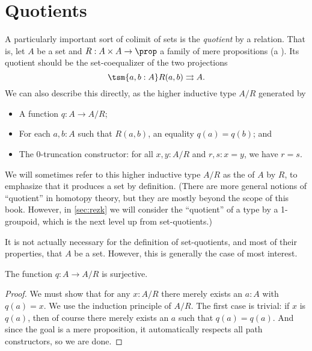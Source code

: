 \section{Quotients}
\label{sec:set-quotients}

A particularly important sort of colimit of sets is the \emph{quotient} by a relation.
That is, let $A$ be a set and $R:A\times A \to \prop$ a family of mere propositions (a ).
%
%
Its quotient should be the set-coequalizer of the two projections
\[ \tsm{a,b:A} R(a,b) \rightrightarrows A. \]
We can also describe this directly, as the higher inductive type $A/R$ generated by
%
%
%
\begin{itemize}
\item A function $q:A\to A/R$;
\item For each $a,b:A$ such that $R(a,b)$, an equality $q(a)=q(b)$; and
\item The $0$-truncation constructor: for all $x,y:A/R$ and $r,s:x=y$, we have $r=s$.
\end{itemize}
We will sometimes refer to this higher inductive type $A/R$ as the  of $A$ by $R$, to emphasize that it produces a set by definition.
(There are more general notions of ``quotient'' in homotopy theory, but they are mostly beyond the scope of this book.
However, in \cref{sec:rezk} we will consider the ``quotient'' of a type by a 1-groupoid, which is the next level up from set-quotients.)

\begin{rmk}\label{rmk:quotient-of-non-set}
  It is not actually necessary for the definition of set-quotients, and most of their properties, that $A$ be a set.
  However, this is generally the case of most interest.
\end{rmk}

\begin{lem}\label{thm:quotient-surjective}
  The function $q:A\to A/R$ is surjective.
\end{lem}
\begin{proof}
  We must show that for any $x:A/R$ there merely exists an $a:A$ with $q(a)=x$.
  We use the induction principle of $A/R$.
  The first case is trivial: if $x$ is $q(a)$, then of course there merely exists an $a$ such that $q(a)=q(a)$.
  And since the goal is a mere proposition, it automatically respects all path constructors, so we are done.
\end{proof}

